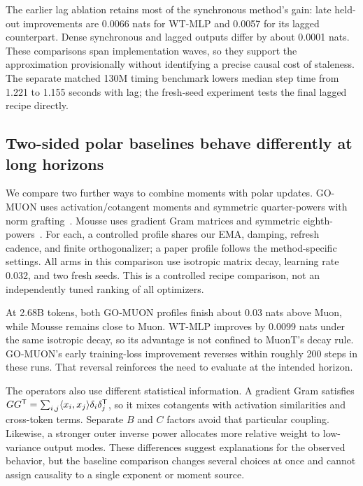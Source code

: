 The earlier lag ablation retains most of the synchronous method's gain: late held-out improvements are 0.0066 nats for WT-MLP and 0.0057 for its lagged counterpart. Dense synchronous and lagged outputs differ by about 0.0001 nats. These comparisons span implementation waves, so they support the approximation provisionally without identifying a precise causal cost of staleness. The separate matched 130M timing benchmark lowers median step time from 1.221 to 1.155 seconds with lag; the fresh-seed experiment tests the final lagged recipe directly.

\subsection{Two-sided polar baselines behave differently at long horizons}
\label{sec:related_baselines}

We compare two further ways to combine moments with polar updates. GO-MUON uses activation/cotangent moments and symmetric quarter-powers with norm grafting~\citep{che2026gomuon}. Mousse uses gradient Gram matrices and symmetric eighth-powers~\citep{zhang2026mousse}. For each, a controlled profile shares our EMA, damping, refresh cadence, and finite orthogonalizer; a paper profile follows the method-specific settings. All arms in this comparison use isotropic matrix decay, learning rate 0.032, and two fresh seeds. This is a controlled recipe comparison, not an independently tuned ranking of all optimizers.



At 2.68B tokens, both GO-MUON profiles finish about 0.03 nats above Muon, while Mousse remains close to Muon. WT-MLP improves by 0.0099 nats under the same isotropic decay, so its advantage is not confined to MuonT's decay rule. GO-MUON's early training-loss improvement reverses within roughly 200 steps in these runs. That reversal reinforces the need to evaluate at the intended horizon.

The operators also use different statistical information. A gradient Gram satisfies $GG^{{\mathsf{T}}}=\sum_{i,j}\langle x_i,x_j\rangle\delta_i\delta_j^{{\mathsf{T}}}$, so it mixes cotangents with activation similarities and cross-token terms. Separate $B$ and $C$ factors avoid that particular coupling. Likewise, a stronger outer inverse power allocates more relative weight to low-variance output modes. These differences suggest explanations for the observed behavior, but the baseline comparison changes several choices at once and cannot assign causality to a single exponent or moment source.

